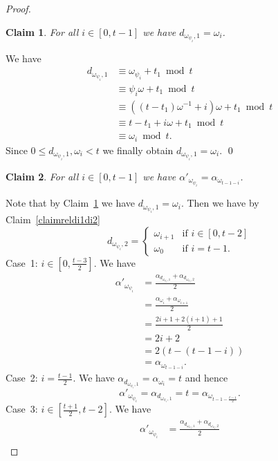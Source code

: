 \documentclass{article}
\newtheorem{claim}{Claim}
\begin{document}
\begin{proof}
\begin{claim}\label{claimreldomegaidomegai1}
For all $i \in [0,t-1]$ we have $d_{\omega_{\psi_i},1} = \omega_i$.
\end{claim}
We have
\begin{align*}
d_{\omega_{\psi_i},1} &\equiv \omega_{\psi_i} + t_1 \bmod t\\
&\equiv \psi_i \omega + t_1 \bmod t\\
&\equiv ((t-t_1)\omega^{-1}+i)\omega + t_1 \bmod t\\
&\equiv t-t_1+i\omega+t_1 \bmod t\\
&\equiv \omega_i \bmod t.
\end{align*}
Since $0 \leq d_{\omega_{\psi_i},1},\omega_i < t$ we finally obtain $d_{\omega_{\psi_i},1} = \omega_i$.
\qed

\begin{claim}\label{claimrelpsiil1i}
For all $i \in [0,t-1]$ we have $\alpha'_{\omega_{\psi_i}} = \alpha_{\omega_{t-1-i}}$.
\end{claim}
Note that by Claim~\ref{claimreldomegaidomegai1} we have $d_{\omega_{\psi_i},1} = \omega_i$. Then we have by Claim~\ref{claimreldi1di2}
\begin{displaymath}
d_{\omega_{\psi_i},2} = \begin{cases}
\omega_{i+1} & \text{if } i \in [0,t-2]\\
\omega_0 & \text{if } i = t-1.
\end{cases}
\end{displaymath}
Case~1: $i \in [0,\frac{t-3}{2}]$. We have
\begin{align*}
\alpha'_{\omega_{\psi_i}}&= \frac{\alpha_{d_{\omega_{\psi_i},1}} + \alpha_{d_{\omega_{\psi_i},2}}}{2}\\
&= \frac{\alpha_{\omega_i} + \alpha_{\omega_{i+1}}}{2}\\
&= \frac{2i+1 + 2(i+1)+1}{2}\\
&= 2i+2\\
&= 2(t-(t-1-i))\\
&= \alpha_{\omega_{t-1-i}}.
\end{align*}
Case~2: $i = \frac{t-1}{2}$. We have $\alpha_{d_{\omega_{\psi_i},1}} = \alpha_{\omega_i} = t$ and hence
\begin{displaymath}
\alpha'_{\omega_{\psi_i}} = \alpha_{d_{\omega_{\psi_i},1}} = t = \alpha_{\omega_{t-1-\frac{t-1}{2}}}.
\end{displaymath}
Case~3: $i \in [\frac{t+1}{2},t-2]$. We have
\begin{align*}
\alpha'_{\omega_{\psi_i}}&= \frac{\alpha_{d_{\omega_{\psi_i},1}} + \alpha_{d_{\omega_{\psi_i},2}}}{2}\\

\end{align*}
\end{proof}
\end{document}
